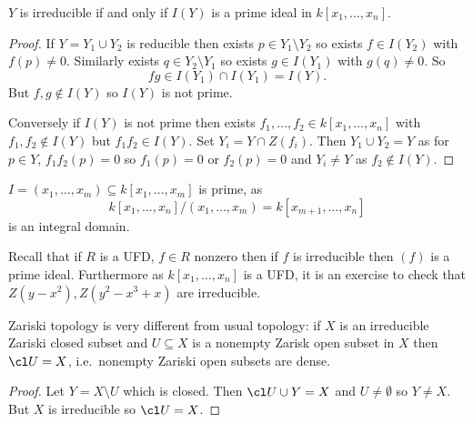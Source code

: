 \documentclass[a4paper]{article}
\begin{document}
\begin{lemma}
  \(Y\) is irreducible if and only if \(I(Y)\) is a prime ideal in \(k[x_1, \dots, x_n]\).
\end{lemma}

\begin{proof}
  If \(Y = Y_1 \cup Y_2\) is reducible then exists \(p \in Y_1 \setminus Y_2\) so exists \(f \in I(Y_2)\) with \(f(p) \neq 0\). Similarly exists \(q \in Y_2 \setminus Y_1\) so exists \(g \in I(Y_1)\) with \(g(q) \neq 0\). So
  \[
    fg \in I(Y_1) \cap I(Y_1) = I(Y).
  \]
  But \(f, g \notin I(Y)\) so \(I(Y)\) is not prime.

  Conversely if \(I(Y)\) is not prime then exists \(f_1, \dots, f_2 \in k[x_1, \dots, x_n]\) with \(f_1, f_2 \notin I(Y)\) but \(f_1f_2 \in I(Y)\). Set \(Y_i = Y \cap Z(f_i)\). Then \(Y_1 \cup Y_2 = Y\) as for \(p \in Y\), \(f_1f_2(p) = 0\) so \(f_1(p) = 0\) or \(f_2(p) = 0\) and \(Y_i \neq Y\) as \(f_2 \notin I(Y)\).
\end{proof}

\begin{eg}
  \(I = (x_1, \dots, x_m) \subseteq k[x_1, \dots, x_m]\) is prime, as
  \[
    k[x_1, \dots, x_n]/(x_1, \dots, x_m) = k[x_{m + 1}, \dots, x_n]
  \]
  is an integral domain.
\end{eg}

Recall that if \(R\) is a UFD, \(f \in R\) nonzero then if \(f\) is irreducible then \((f)\) is a prime ideal. Furthermore as \(k[x_1, \dots, x_n]\) is a UFD, it is an exercise to check that \(Z(y -x^2), Z(y^2 - x^3 + x)\) are irreducible.

Zariski topology is very different from usual topology: if \(X\) is an irreducible Zariski closed subset and \(U \subseteq X\) is a nonempty Zarisk open subset in \(X\) then \(\cl U = X\), i.e.\ nonempty Zariski open subsets are dense.

\begin{proof}
  Let \(Y = X \setminus U\) which is closed. Then \(\cl U \cup Y = X\) and \(U \neq \emptyset\) so \(Y \neq X\). But \(X\) is irreducible so \(\cl U = X\).
\end{proof}
\end{document}
